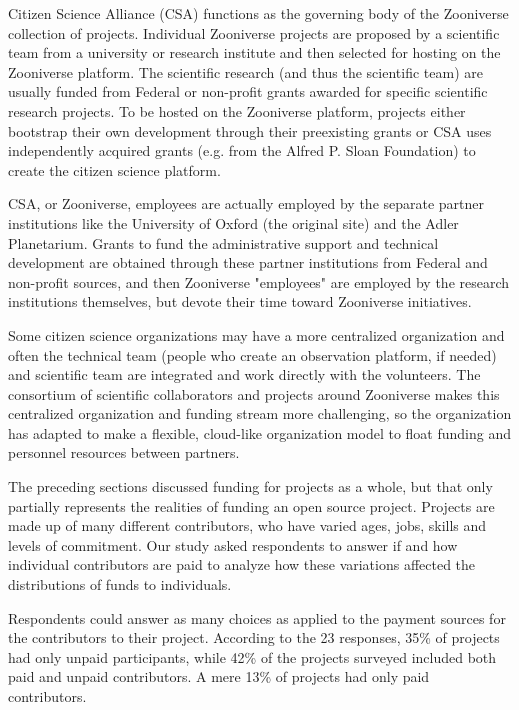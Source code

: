 Citizen Science Alliance (CSA) functions as the governing body of the Zooniverse collection of projects. Individual Zooniverse projects are proposed by a scientific team from a university or research institute and then selected for hosting on the Zooniverse platform. The scientific research (and thus the scientific team) are usually funded from Federal or non-profit grants awarded for specific scientific research projects. To be hosted on the Zooniverse platform, projects either bootstrap their own development through their preexisting grants or CSA uses independently acquired grants (e.g. from the Alfred P. Sloan Foundation) to create the citizen science platform.

CSA, or Zooniverse, employees are actually employed by the separate partner institutions like the University of Oxford (the original site) and the Adler Planetarium. Grants to fund the administrative support and technical development are obtained through these partner institutions from Federal and non-profit sources, and then Zooniverse "employees" are employed by the research institutions themselves, but devote their time toward Zooniverse initiatives.

Some citizen science organizations may have a more centralized organization and often the technical team (people who create an observation platform, if needed) and scientific team are integrated and work directly with the volunteers. The consortium of scientific collaborators and projects around Zooniverse makes this centralized organization and funding stream more challenging, so the organization has adapted to make a flexible, cloud-like organization model to float funding and personnel resources between partners.


The preceding sections discussed funding for projects as a whole, but that only partially represents the realities of funding an open source project. Projects are made up of many different contributors, who have varied ages, jobs, skills and levels of commitment. Our study asked respondents to answer if and how individual contributors are paid to analyze how these variations affected the distributions of funds to individuals. 

Respondents could answer as many choices as applied to the payment sources for the contributors to their project. According to the 23 responses, 35\% of projects had only unpaid participants, while 42\% of the projects surveyed included both paid and unpaid contributors. A mere 13\% of projects had only paid contributors.

